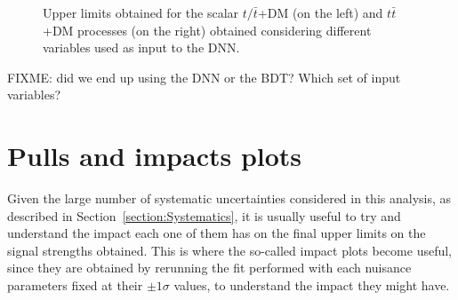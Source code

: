 \documentclass[a4paper, 10pt, openright]{report}
\begin{document}
\begin{appendices}
\begin{figure}[htbp]
{\begin{minipage}[b]{.48\textwidth}
\end{minipage} \hfill
}
\caption{Upper limits obtained for the scalar $t/\bar t$+DM (on the left) and $t \bar t$+DM processes (on the right) obtained considering different variables used as input to the \ac{DNN}.}
\label{fig:optVarDNN}
\end{figure}

\color{red} FIXME: did we end up using the DNN or the BDT? Which set of input variables? \color{black}

\chapter{Pulls and impacts plots} \label{appendix:Impact}

Given the large number of systematic uncertainties considered in this analysis, as described in Section~\ref{section:Systematics}, it is usually useful to try and understand the impact each one of them has on the final upper limits on the signal strengths obtained. This is where the so-called impact plots become useful, since they are obtained by rerunning the fit performed with each nuisance parameters fixed at their $\pm 1 \sigma$ values, to understand the impact they might have.

\end{appendices}
\end{document}

